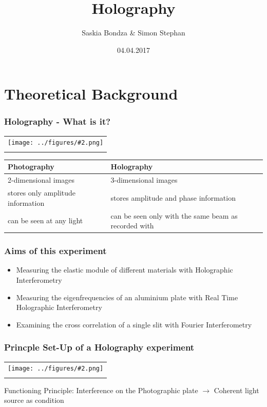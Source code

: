 \documentclass[10pt]{beamer}
\title{Holography}
\author{Saskia Bondza \& Simon Stephan}
\date{04.04.2017}
\newcommand{\gra}[3][]{
	\begin{table}
	\centering
	\begin{tabular}[width=\textwidth]{c}
		\texttt{[image: ../figures/\#2.png]}\\
		\small #3
	\end{tabular}
	\end{table}
}
\begin{document}
\maketitle
\frame{\tableofcontents}
\section{Theoretical Background}
\frame{\tableofcontents[currentsection]}
\begin{frame}
	\frametitle{Holography - What is it?}
	\gra[0.35]{holo-schach}{}
		\begin{tabular}{p{5cm}|p{5cm}}
			\textbf{Photography}&\textbf{Holography}\\\hline
			2-dimensional images&3-dimensional images\\\hline
			stores only amplitude information&stores amplitude and phase information\\\hline
			can be seen at any light&can be seen only with the same beam as recorded with
		\end{tabular}
\end{frame}
\begin{frame}
	\frametitle{Aims of this experiment}
	\begin{itemize}
		\item Measuring the elastic module of different materials with Holographic Interferometry
		\item Measuring the eigenfrequencies of an aluminium plate with Real Time Holographic Interferometry
		\item Examining the cross correlation of a single slit with Fourier Interferometry
	\end{itemize}
\end{frame}

\begin{frame}
	\frametitle{Princple Set-Up of a Holography experiment}
	\gra[0.8]{PrincipleSetUp}{}
	Functioning Principle: Interference on the Photographic plate $\rightarrow$ Coherent light source as condition
\end{frame}
\end{document}
